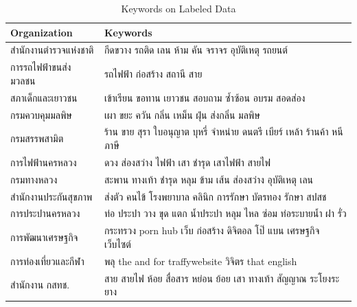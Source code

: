 \documentclass[12pt, a4paper]{article}
\begin{document}
                    \begin{table}[h]
                        \centering
                        \begin{tabular}{|l|l|}
                            \hline
                            \rule{0pt}{2.5ex}
                            \textbf{Organization} & \textbf{Keywords} \\
                            \hline \hline
                            สำนักงานตำรวจแห่งชาติ & กีดขวาง รถติด เลน ห้าม คัน จราจร อุบัติเหตุ รถยนต์ \\
                            การรถไฟฟ้าขนส่งมวลชน & รถไฟฟ้า ก่อสร้าง สถานี สาย \\
                            สภาเด็กและเยาวชน & เข้าเรียน ขอทาน เยาวชน สอบถาม ซ้ำซ้อน อบรม สอดส่อง \\
                            กรมควบคุมมลพิษ & เผา ขยะ ควัน กลิ่น เหม็น ฝุ่น ส่งกลิ่น มลพิษ \\
                            กรมสรรพสามิต & ร้าน ขาย สุรา ใบอนุญาต บุหรี่ จำหน่าย ดนตรี เบียร์ เหล้า ร้านค้า หนีภาษี \\
                            การไฟฟ้านครหลวง & ดวง ส่องสว่าง ไฟฟ้า เสา ชำรุด เสาไฟฟ้า สายไฟ \\
                            กรมทางหลวง & สะพาน ทางเท้า ชำรุด หลุม ข้าม เส้น ส่องสว่าง อุบัติเหตุ เลน \\
                            สำนักงานประกันสุขภาพ & ส่งตัว คนไข้ โรงพยาบาล คลินิก การรักษา บัตรทอง รักษา สปสช \\
                            การประปานครหลวง & ท่อ ประปา วาง ขุด แตก น้ำประปา หลุม ไหล ซ่อม ท่อระบายน้ำ ฝา รั่ว \\
                            การพัฒนาเศรษฐกิจ & กระทรวง porn hub เว็บ ก่อสร้าง ดิจิตอล โป๊ แบน เศรษฐกิจ เว็บไซต์ \\
                            การท่องเที่ยวและกีฬา & พลุ the and for traffywebsite วิจิตร that english \\
                            สำนักงาน กสทช. & สาย สายไฟ ห้อย สื่อสาร หย่อน ย้อย เสา ทางเท้า สัญญาณ ระโยงระยาง \\
                            \hline
                        \end{tabular}
                        \caption{Keywords on Labeled Data}
                    \end{table}
\end{document}
